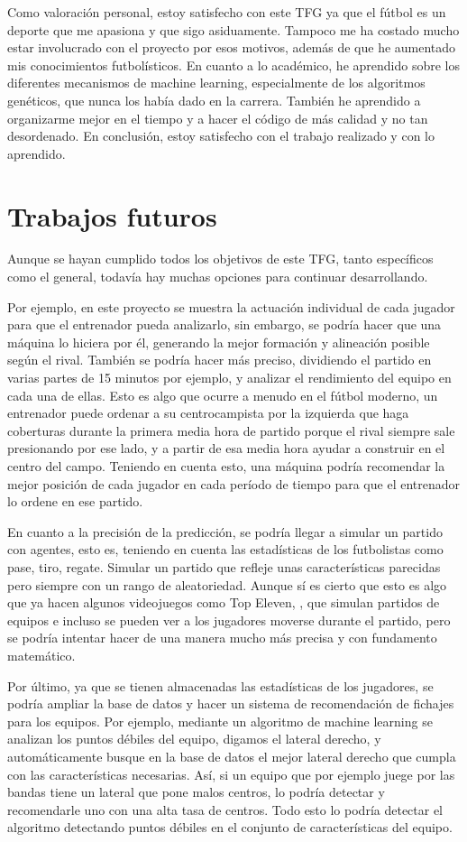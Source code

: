 Como valoración personal, estoy satisfecho con este TFG ya que el fútbol es un deporte que me apasiona y que sigo asiduamente. Tampoco me ha costado mucho estar involucrado con el proyecto  por esos motivos, además de que he aumentado mis conocimientos futbolísticos. En cuanto a lo académico, he aprendido sobre los diferentes mecanismos de machine learning, especialmente de los algoritmos genéticos, que nunca los había dado en la carrera. También he aprendido a organizarme mejor en el tiempo y a hacer el código de más calidad y no tan desordenado. En conclusión, estoy satisfecho con el trabajo realizado y con lo aprendido.

\section{Trabajos futuros}
Aunque se hayan cumplido todos los objetivos de este TFG, tanto específicos como el general, todavía hay muchas opciones para continuar desarrollando.

Por ejemplo, en este proyecto se muestra la actuación individual de cada jugador para que el entrenador pueda analizarlo, sin embargo, se podría hacer que una máquina lo hiciera por él, generando la mejor formación y alineación posible según el rival. También se podría hacer más preciso, dividiendo el partido en varias partes de 15 minutos por ejemplo, y analizar el rendimiento del equipo en cada una de ellas. Esto es algo que ocurre a menudo en el fútbol moderno, un entrenador puede ordenar a su centrocampista por la izquierda que haga coberturas durante la primera media hora de partido porque el rival siempre sale presionando por ese lado, y a partir de esa media hora ayudar a construir en el centro del campo. Teniendo en cuenta esto, una máquina podría recomendar la mejor posición de cada jugador en cada período de tiempo para que el entrenador lo ordene en ese partido.

En cuanto a la precisión de la predicción, se podría llegar a simular un partido con agentes, esto es, teniendo en cuenta las estadísticas de los futbolistas como pase, tiro, regate. Simular un partido que refleje unas características parecidas pero siempre con un rango de aleatoriedad. Aunque sí es cierto que esto es algo que ya hacen algunos videojuegos como Top Eleven, \cite{Top_eleven}, que simulan partidos de equipos e incluso se pueden ver a los jugadores moverse durante el partido, pero se podría intentar hacer de una manera mucho más precisa y con fundamento matemático.

Por último, ya que se tienen almacenadas las estadísticas de los jugadores, se podría ampliar la base de datos y hacer un sistema de recomendación de fichajes para los equipos. Por ejemplo, mediante un algoritmo de machine learning se analizan los puntos débiles del equipo, digamos el lateral derecho, y automáticamente busque en la base de datos el mejor lateral derecho que cumpla con las características necesarias. Así, si un equipo que por ejemplo juege por las bandas tiene un lateral que pone malos centros, lo podría detectar y recomendarle uno con una alta tasa de centros. Todo esto lo podría detectar el algoritmo detectando puntos débiles en el conjunto de características del equipo.